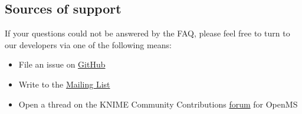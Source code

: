 \subsection{Sources of support}
If your questions could not be answered by the FAQ, please feel free to turn to our developers via one of the following means:
\begin{itemize}
\item File an issue on \href{https://github.com/OpenMS/OpenMS/issues}{GitHub}
\item Write to the \href{mailto:open-ms-developers@lists.sourceforge.net}{Mailing List}
\item Open a thread on the KNIME Community Contributions \href{https://tech.knime.org/forum/openms}{forum} for OpenMS
\end{itemize}
